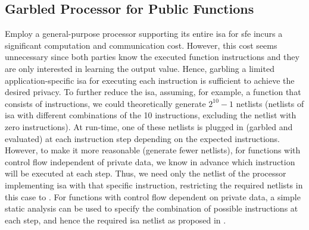 \subsection{Garbled Processor for Public Functions}\label{ssec:processor-mips-sfe-public}
Employ a general-purpose processor supporting its entire \acrshort{isa} for \acrshort{sfe} incurs a significant computation and communication cost.
However, this cost seems unnecessary since both parties know the executed function instructions and they are only interested in learning the output value.
Hence, garbling a limited application-specific \acrshort{isa} for executing each instruction is sufficient to achieve the desired privacy.
To further reduce the \acrshort{isa}, assuming, for example, a function that consists of  instructions, we could theoretically generate $2^{10} -1$ \gls{netlist}s (\gls{netlist}s of \acrshort{isa} with different combinations of the 10 instructions, excluding the \gls{netlist} with zero instructions).
At run-time, one of these \gls{netlist}s is plugged in (garbled and evaluated) at each instruction step depending on the expected instructions.
However, to make it more reasonable (generate fewer \gls{netlist}s), for functions with control flow independent of private data, we know in advance which instruction will be executed at each step.
Thus, we need only the \gls{netlist} of the processor implementing \acrshort{isa} with that specific instruction, restricting the required \gls{netlist}s in this case to .
For functions with control flow dependent on private data, a simple static analysis can be used to specify the combination of possible instructions at each step, and hence the required \acrshort{isa} \gls{netlist} as proposed in \cite{wang2016secure}.

